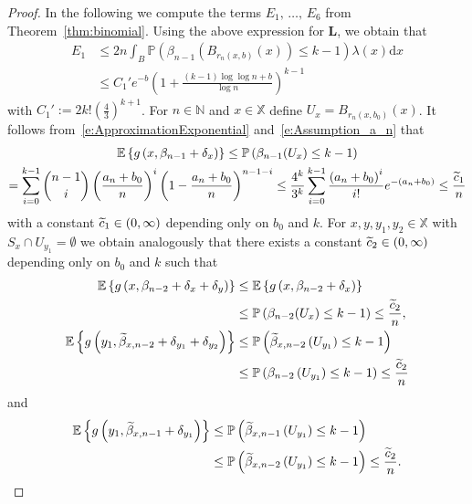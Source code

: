\documentclass[10pt]{amsart}
\theoremstyle{definition}\newtheorem{defi}[theo]{Definition}\newtheorem{rema}[theo]{Remark}\newtheorem{exam}[theo]{Example}\newtheorem{exem}[theo]{Example}\newtheorem{nota}[theo]{Notation}
\newcommand*\bL{\mathbf{L}}
\newcommand*\N{\mathbb{N}}
\renewcommand*\P{\mathbb{P}}
\newcommand*\X{\mathbb{X}}
\newcommand{\E}{\mathbb{E}}
\newcommand*\md{\mathrm{d}}
\newcommand{\mean}[1] {\E\left\{{#1}\right\}}
\newcommand{\param}[1]{\left(#1\right)}
\newcommand{\prob}[1]{\P\left(#1\right)}
\let\oldtilde\tilde
\renewcommand*{\tilde}[1]{\mathchoice{\widetilde{#1}}{\widetilde{#1}}{\oldtilde{#1}}{\oldtilde{#1}}}
\begin{document}
\begin{proof}
In the following we compute the terms $E_1,\,\hdots,\,E_6$ from Theorem~\ref{thm:binomial}. Using the above expression for $\bL$, we obtain that
\begin{equation}\label{e:E1bin}
\begin{split}
E_1 & \leq 2n \int_B \prob{ \beta_{n-1}\left(B_{r_n(x,b)}(x)\right)\leq k-1} \lambda(x) \md x \\
&\leq C_1' e^{-b}\param{1 + \frac{(k-1)\log \log n +b}{\log n}}^{k-1}
\end{split}
\end{equation}
with $C_1':=2k! (\tfrac{4}{3})^{k+1}$. For $n\in\N$ and $x\in\X$ define $U_{x}=B_{r_n(x,b_0)}(x)$. It follows from~\eqref{e:ApproximationExponential} and~\eqref{e:Assumption_a_n} that
\begin{multline}\label{e:gbetan-1}
\mean{g\left(x,\beta_{n-1}+\delta_x\right)} \leq \prob{\beta_{n-1}(U_x)\leq k-1}\\
= \sum_{i=0}^{k-1} \binom{n-1}{i} \left(\frac{a_n+b_0}{n} \right)^i \left(1-\frac{a_n+b_0}{n} \right)^{n-1-i} 
 \leq \frac{4^k}{3^k} \sum_{i=0}^{k-1} \frac{\left(a_n+b_0\right)^i}{i!} e^{-\left(a_n+b_0\right)} \leq \frac{\tilde{c}_1}{n}
\end{multline}
with a constant $\tilde{c}_1\in(0,\infty)$ depending only on $b_0$ and $k$. For $x,y,y_1,y_2\in\X$ with $S_x\cap U_{y_1}=\emptyset$ we obtain analogously that there exists a constant $\tilde{c}_2\in(0,\infty)$ depending only on $b_0$ and $k$ such that
\begin{align}
\mean{g\left(x,\beta_{n-2}+\delta_x+\delta_y\right)} & \leq \mean{g\left(x,\beta_{n-2}+\delta_x\right)}\label{e:gbetan-2}\\
 &\leq \prob{\beta_{n-2}(U_x)\leq k-1} \leq \frac{\tilde{c}_2}{n},\nonumber\\
\mean{g\left(y_1,\widetilde{\beta}_{x,n-2}+\delta_{y_1}+\delta_{y_2}\right)} & \leq \prob{\widetilde{\beta}_{x,n-2}\left(U_{y_1}\right)\leq k-1}\label{e:gtildebetan-2}\\
 &\leq \prob{\beta_{n-2}\left(U_{y_1}\right)\leq k-1} \leq \frac{\tilde{c}_2}{n}\nonumber
\end{align}
and
\begin{equation}\label{e:gtildebetan-1}
\begin{split}
\mean{g\left(y_1,\widetilde{\beta}_{x,n-1}+\delta_{y_1}\right)} &\leq \prob{\widetilde{\beta}_{x,n-1}\left(U_{y_1}\right)\leq k-1}\\
&\leq \prob{\widetilde{\beta}_{x,n-2}\left(U_{y_1}\right)\leq k-1} \leq \frac{\tilde{c}_2}{n}.

\end{split}
\end{equation}
\end{proof}
\end{document}
